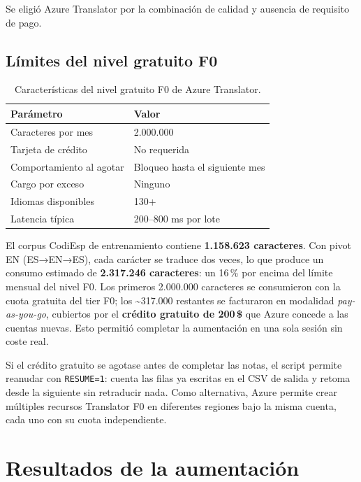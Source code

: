 Se eligió Azure Translator por la combinación de calidad y ausencia de requisito de pago.

\subsection{Límites del nivel gratuito F0}

\begin{table}[h]
\centering
\caption{Características del nivel gratuito F0 de Azure Translator.}
\label{tab:azure-f0}
\begin{tabular}{ll}
\hline
\textbf{Parámetro} & \textbf{Valor} \\
\hline
Caracteres por mes         & 2.000.000 \\
Tarjeta de crédito         & No requerida \\
Comportamiento al agotar   & Bloqueo hasta el siguiente mes \\
Cargo por exceso           & Ninguno \\
Idiomas disponibles        & 130+ \\
Latencia típica            & 200--800 ms por lote \\
\hline
\end{tabular}
\end{table}

El corpus CodiEsp de entrenamiento contiene \textbf{1.158.623 caracteres}. Con pivot EN (ES→EN→ES), cada carácter se traduce dos veces, lo que produce un consumo estimado de \textbf{2.317.246 caracteres}: un 16\,\% por encima del límite mensual del nivel F0. Los primeros 2.000.000 caracteres se consumieron con la cuota gratuita del tier F0; los \textasciitilde317.000 restantes se facturaron en modalidad \emph{pay-as-you-go}, cubiertos por el \textbf{crédito gratuito de 200\,\$} que Azure concede a las cuentas nuevas. Esto permitió completar la aumentación en una sola sesión sin coste real.

Si el crédito gratuito se agotase antes de completar las notas, el script permite reanudar con \texttt{RESUME=1}: cuenta las filas ya escritas en el CSV de salida y retoma desde la siguiente sin retraducir nada. Como alternativa, Azure permite crear múltiples recursos Translator F0 en diferentes regiones bajo la misma cuenta, cada uno con su cuota independiente.

\section{Resultados de la aumentación}


